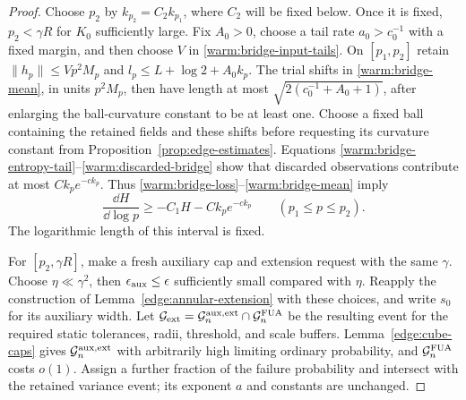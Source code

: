 \begin{proof}
Choose \(p_2\) by \(k_{p_2}=C_2k_{p_1}\), where \(C_2\) will be
fixed below.  Once it is fixed, \(p_2<\gamma R\) for \(K_0\)
sufficiently large.  Fix \(A_0>0\), choose a tail rate
\(a_0>c_0^{-1}\) with a fixed margin, and then choose \(V\) in
\eqref{warm:bridge-input-tails}.  On \([p_1,p_2]\) retain
\(\|h_p\|\le Vp^2M_p\) and \(l_p\le L+\log2+A_0k_p\).
The trial shifts in \eqref{warm:bridge-mean}, in units \(p^2M_p\),
then have length at most
\(\sqrt{2(c_0^{-1}+A_0+1)}\), after enlarging the ball-curvature
constant to be at least one.  Choose a fixed ball containing the retained
fields and these shifts before requesting its curvature constant from
Proposition~\ref{prop:edge-estimates}.  Equations
\eqref{warm:bridge-entropy-tail}--\eqref{warm:discarded-bridge}
show that discarded observations contribute at most \(Ck_pe^{-c k_p}\).
Thus \eqref{warm:bridge-loss}--\eqref{warm:bridge-mean} imply
\[
 \frac{\dd H}{\dd\log p}\ge-C_1H-Ck_pe^{-c k_p}
       \qquad(p_1\le p\le p_2).
\]
The logarithmic length of this interval is fixed.

For \([p_2,\gamma R]\), make a fresh auxiliary cap and extension
request with the same \(\gamma\).  Choose \(\eta\ll\gamma^2\), then
\(\epsilon_{\rm aux}\le\epsilon\) sufficiently small compared with
\(\eta\).  Reapply the construction of Lemma~\ref{edge:annular-extension}
with these choices, and write \(s_0\) for its auxiliary width.
Let \(\mathcal G_{\rm ext}=\mathcal G_n^{\rm aux,ext}
\cap\mathcal G_n^{\rm FUA}\) be the resulting event for the required
static tolerances, radii, threshold, and scale buffers.
Lemma~\ref{edge:cube-caps} gives \(\mathcal G_n^{\rm aux,ext}\) with
arbitrarily high limiting ordinary probability, and
\(\mathcal G_n^{\rm FUA}\) costs \(o(1)\).  Assign a further fraction
of the failure probability and intersect with the retained variance
event; its exponent \(a\) and constants are unchanged.


\end{proof}
